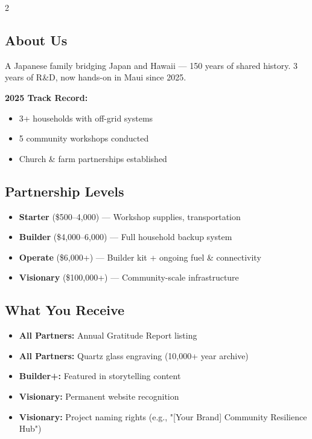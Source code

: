 \documentclass[9pt,a4paper]{article}
\begin{document}
\begin{multicols}{2}
\subsection*{About Us}
A Japanese family bridging Japan and Hawaii — 150 years of shared history. 3 years of R\&D, now hands-on in Maui since 2025.

\textbf{2025 Track Record:}
\begin{itemize}
\item 3+ households with off-grid systems
\item 5 community workshops conducted
\item Church \& farm partnerships established
\end{itemize}

\columnbreak

\subsection*{Partnership Levels}
\begin{itemize}
\item \textbf{Starter} (\$500–4,000) — Workshop supplies, transportation
\item \textbf{Builder} (\$4,000–6,000) — Full household backup system
\item \textbf{Operate} (\$6,000+) — Builder kit + ongoing fuel \& connectivity
\item \textbf{Visionary} (\$100,000+) — Community-scale infrastructure
\end{itemize}

\subsection*{What You Receive}
\begin{itemize}
\item \textbf{All Partners:} Annual Gratitude Report listing
\item \textbf{All Partners:} Quartz glass engraving (10,000+ year archive)
\item \textbf{Builder+:} Featured in storytelling content
\item \textbf{Visionary:} Permanent website recognition
\item \textbf{Visionary:} Project naming rights (e.g., "[Your Brand] Community Resilience Hub")
\end{itemize}


\end{multicols}
\end{document}
